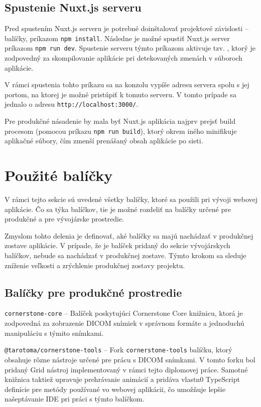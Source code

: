 \subsection {Spustenie Nuxt.js serveru}
Pred spustením Nuxt.js serveru je potrebné doinštalovať projektové závislosti -- balíčky, príkazom \texttt{npm install}. Následne je možné spustiť Nuxt.js server príkazom \texttt{npm run dev}. Spustenie serveru týmto príkazom aktivuje tzv. , ktorý je zodpovedný za skompilovanie aplikácie pri detekovaných zmenách v súboroch aplikácie.

V rámci spustenia tohto príkazu sa na konzolu vypíše adresu servera spolu s jej portom, na ktorej je možné pristúpiť k tomuto serveru. V tomto prípade sa jednalo o adresu \texttt{http://localhost:3000/}. 

Pre produkčné násadenie by mala byť Nuxt.js aplikácia najprv prejsť build procesom (pomocou príkazu \texttt{npm run build}), ktorý okrem iného minifikuje aplikačné súbory, čím zmenší prenášaný obsah aplikácie po sieti.

\clearpage

\section {Použité balíčky}
V rámci tejto sekcie sú uvedené všetky balíčky, ktoré sa použili pri vývoji webovej aplikácie.
Čo sa týka balíčkov, tie je možné rozdeliť na balíčky určené pre produkčné a pre vývojárske prostredie.

Zmyslom tohto delenia je definovať, aké balíčky sa majú nachádzať v produkčnej zostave aplikácie. V prípade, že je balíček pridaný do sekcie vývojárskych balíčkov, nebude sa nachádzať v produkčnej zostave. Týmto krokom sa sleduje zníženie veľkosti a zrýchlenie produkčnej zostavy projektu.

\subsection {Balíčky pre produkčné prostredie}
\texttt{cornerstone-core} -- Balíček poskytujúci Cornerstone Core knižnicu, ktorá je zodpovedná za zobrazenie DICOM snímiek v správnom formáte a jednoduchú manipuláciu s týmito snímkami.

\texttt{@tarotoma/cornerstone-tools} -- Fork \texttt{cornerstone-tools} balíčku, ktorý obsahuje rôzne nástroje určené pre prácu s DICOM snímkami. V tomto forku bol pridaný Grid nástroj implementovaný v rámci tejto diplomovej práce. Samotné knižnica taktiež upravuje prehrávanie animácií a pridáva vlastn0 TypeScript definície pre metódy používané vo webovej aplikácii, čo umožňuje lepšie našeptávanie IDE pri práci s týmto balíčkom.

